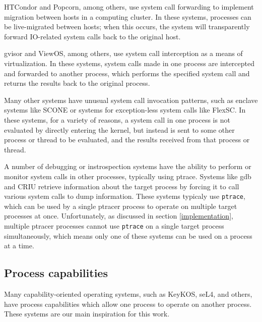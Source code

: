 \documentclass[letterpaper,twocolumn,10pt]{article}
\begin{document}
HTCondor\cite{condor} and Popcorn\cite{popcorn}, among others,
use system call forwarding to implement migration between hosts in a computing cluster.
In these systems, processes can be live-migrated between hosts;
when this occurs, the system will transparently forward IO-related system calls
back to the original host.

gvisor\cite{gvisor} and ViewOS\cite{viewos}, among others,
use system call interception as a means of virtualization.
In these systems,
system calls made in one process are intercepted and forwarded to another process,
which performs the specified system call and returns the results back to the original process.

Many other systems have unusual system call invocation patterns,
such as enclave systems like SCONE\cite{scone}\cite{eleos}
or systems for exception-less system calls like FlexSC\cite{flexsc}.
In these systems, for a variety of reasons,
a system call in one process is not evaluated by directly entering the kernel,
but instead is sent to some other process or thread to be evaluated,
and the results received from that process or thread.

A number of debugging or instrospection systems have the ability to perform or monitor system calls in other processes,
typically using ptrace.
Systems like gdb and CRIU
retrieve information about the target process by forcing it to call various system calls to dump information.
These systems typicaly use \texttt{ptrace},
which can be used by a single ptracer process to operate on multiple target processes at once.
Unfortunately, as discussed in section \ref{implementation},
multiple ptracer processes cannot use \texttt{ptrace} on a single target process simultaneously,
which means only one of these systems can be used on a process at a time.

\subsection{Process capabilities}
Many capability-oriented operating systems, such as KeyKOS\cite{keykos}, seL4\cite{sel4}, and others\cite{fuchsia},
have process capabilities which allow one process to operate on another process.
These systems are our main inspiration for this work.
\end{document}
